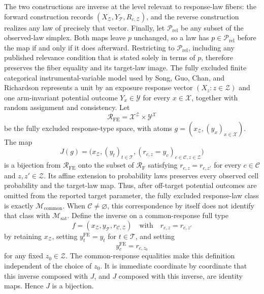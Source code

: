 The two constructions are inverse at the level relevant to response-law fibers: the forward construction records \((X_{\mathcal Z},Y_{\mathcal T},R_{c,\mathcal Z})\), and the reverse construction realizes any law of precisely that vector.  Finally, let \(\mathcal P_{\mathrm{rel}}\) be any subset of the observed-law simplex.  Both maps leave \(p\) unchanged, so a law has \(p\in\mathcal P_{\mathrm{rel}}\) before the map if and only if it does afterward.  Restricting to \(\mathcal P_{\mathrm{rel}}\), including any published relevance condition that is stated solely in terms of \(p\), therefore preserves the fiber equality and its target-law image.
The fully excluded finite categorical instrumental-variable model used by Song, Guo, Chan, and Richardson represents a unit by an exposure response vector \((X_z:z\in\mathcal Z)\) and one arm-invariant potential outcome \(Y_x\in\mathcal Y\) for every \(x\in\mathcal X\), together with random assignment and consistency.
Let
\[
\mathcal R_{\mathrm{FE}}=\mathcal X^{\mathcal Z}\times\mathcal Y^{\mathcal X}
\]
be the fully excluded response-type space, with atoms \(g=(x_{\mathcal Z},(y_x)_{x\in\mathcal X})\).  The map
\[
J(g)=\bigl(x_{\mathcal Z},(y_t)_{t\in\mathcal T},
(r_{c,z}=y_c)_{c\in\mathcal C,z\in\mathcal Z}\bigr)
\]
is a bijection from \(\mathcal R_{\mathrm{FE}}\) onto the subset of \(\mathcal R_{\mathrm F}\) satisfying \(r_{c,z}=r_{c,z'}\) for every \(c\in\mathcal C\) and \(z,z'\in\mathcal Z\).  Its affine extension to probability laws preserves every observed cell probability and the target-law map.  Thus, after off-target potential outcomes are omitted from the reported target parameter, the fully excluded response-law class is exactly \(\mathcal M_{\mathrm{common}}\).  When \(\mathcal C\ne\varnothing\), this correspondence by itself does not identify that class with \(\mathcal M_{\mathrm{sat}}\).
Define the inverse on a common-response full type
\[
f=(x_{\mathcal Z},y_{\mathcal T},r_{\mathcal C,\mathcal Z})
\quad\text{with}\quad
r_{c,z}=r_{c,z'}
\]
by retaining \(x_{\mathcal Z}\), setting \(y_t^{\mathrm{FE}}=y_t\) for \(t\in\mathcal T\), and setting
\[
y_c^{\mathrm{FE}}=r_{c,z_0}
\]
for any fixed \(z_0\in\mathcal Z\).  The common-response equalities make this definition independent of the choice of \(z_0\).  It is immediate coordinate by coordinate that this inverse composed with \(J\), and \(J\) composed with this inverse, are identity maps.  Hence \(J\) is a bijection.


